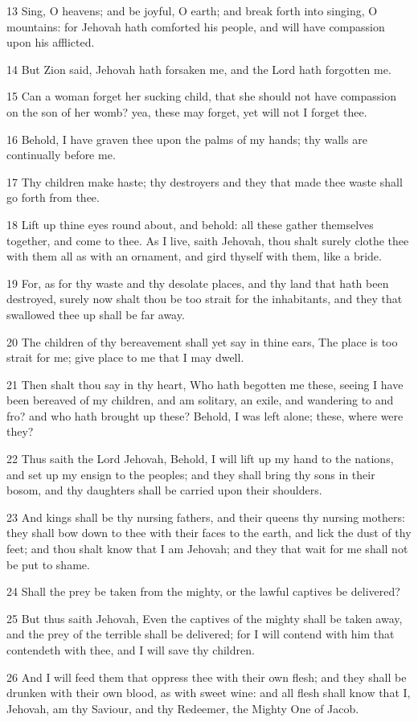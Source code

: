 \par 13 Sing, O heavens; and be joyful, O earth; and break forth into singing, O mountains: for Jehovah hath comforted his people, and will have compassion upon his afflicted.
\par 14 But Zion said, Jehovah hath forsaken me, and the Lord hath forgotten me.
\par 15 Can a woman forget her sucking child, that she should not have compassion on the son of her womb? yea, these may forget, yet will not I forget thee.
\par 16 Behold, I have graven thee upon the palms of my hands; thy walls are continually before me.
\par 17 Thy children make haste; thy destroyers and they that made thee waste shall go forth from thee.
\par 18 Lift up thine eyes round about, and behold: all these gather themselves together, and come to thee. As I live, saith Jehovah, thou shalt surely clothe thee with them all as with an ornament, and gird thyself with them, like a bride.
\par 19 For, as for thy waste and thy desolate places, and thy land that hath been destroyed, surely now shalt thou be too strait for the inhabitants, and they that swallowed thee up shall be far away.
\par 20 The children of thy bereavement shall yet say in thine ears, The place is too strait for me; give place to me that I may dwell.
\par 21 Then shalt thou say in thy heart, Who hath begotten me these, seeing I have been bereaved of my children, and am solitary, an exile, and wandering to and fro? and who hath brought up these? Behold, I was left alone; these, where were they?
\par 22 Thus saith the Lord Jehovah, Behold, I will lift up my hand to the nations, and set up my ensign to the peoples; and they shall bring thy sons in their bosom, and thy daughters shall be carried upon their shoulders.
\par 23 And kings shall be thy nursing fathers, and their queens thy nursing mothers: they shall bow down to thee with their faces to the earth, and lick the dust of thy feet; and thou shalt know that I am Jehovah; and they that wait for me shall not be put to shame.
\par 24 Shall the prey be taken from the mighty, or the lawful captives be delivered?
\par 25 But thus saith Jehovah, Even the captives of the mighty shall be taken away, and the prey of the terrible shall be delivered; for I will contend with him that contendeth with thee, and I will save thy children.
\par 26 And I will feed them that oppress thee with their own flesh; and they shall be drunken with their own blood, as with sweet wine: and all flesh shall know that I, Jehovah, am thy Saviour, and thy Redeemer, the Mighty One of Jacob.

